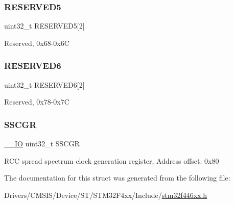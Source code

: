\subsubsection{\texorpdfstring{R\+E\+S\+E\+R\+V\+E\+D5}{RESERVED5}}
{\footnotesize\ttfamily uint32\+\_\+t R\+E\+S\+E\+R\+V\+E\+D5\mbox{[}2\mbox{]}}

Reserved, 0x68-\/0x6C \mbox{\label{struct_r_c_c___type_def_a10da398d74a1f88d5b42bd40718d9447}} 
\subsubsection{\texorpdfstring{R\+E\+S\+E\+R\+V\+E\+D6}{RESERVED6}}
{\footnotesize\ttfamily uint32\+\_\+t R\+E\+S\+E\+R\+V\+E\+D6\mbox{[}2\mbox{]}}

Reserved, 0x78-\/0x7C \mbox{\label{struct_r_c_c___type_def_aaef3da59eaf7c6dfdf9a12fd60ce58a8}} 
\subsubsection{\texorpdfstring{S\+S\+C\+GR}{SSCGR}}
{\footnotesize\ttfamily \mbox{\hyperlink{core__sc300_8h_aec43007d9998a0a0e01faede4133d6be}{\+\_\+\+\_\+\+IO}} uint32\+\_\+t S\+S\+C\+GR}

R\+CC spread spectrum clock generation register, Address offset\+: 0x80 

The documentation for this struct was generated from the following file\+:\begin{DoxyCompactItemize}
\item 
Drivers/\+C\+M\+S\+I\+S/\+Device/\+S\+T/\+S\+T\+M32\+F4xx/\+Include/\mbox{\hyperlink{stm32f446xx_8h}{stm32f446xx.\+h}}\end{DoxyCompactItemize}
